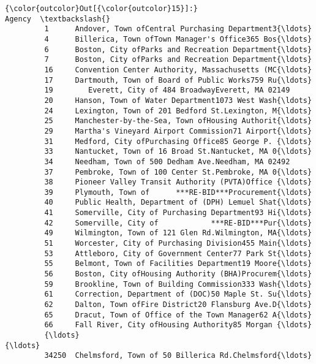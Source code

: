 \documentclass[11pt]{article}
\begin{document}
\begin{Verbatim}[commandchars=\\\{\}]
{\color{outcolor}Out[{\color{outcolor}15}]:}                                                   Agency  \textbackslash{}
         1      Andover, Town ofCentral Purchasing Department3{\ldots}   
         4      Billerica, Town ofTown Manager's Office365 Bos{\ldots}   
         6      Boston, City ofParks and Recreation Department{\ldots}   
         7      Boston, City ofParks and Recreation Department{\ldots}   
         16     Convention Center Authority, Massachusetts (MC{\ldots}   
         17     Dartmouth, Town of Board of Public Works759 Ru{\ldots}   
         19        Everett, City of 484 BroadwayEverett, MA 02149   
         20     Hanson, Town of Water Department1073 West Wash{\ldots}   
         24     Lexington, Town of 201 Bedford St.Lexington, M{\ldots}   
         25     Manchester-by-the-Sea, Town ofHousing Authorit{\ldots}   
         29     Martha's Vineyard Airport Commission71 Airport{\ldots}   
         31     Medford, City ofPurchasing Office85 George P. {\ldots}   
         33     Nantucket, Town of 16 Broad St.Nantucket, MA 0{\ldots}   
         34     Needham, Town of 500 Dedham Ave.Needham, MA 02492   
         37     Pembroke, Town of 100 Center St.Pembroke, MA 0{\ldots}   
         38     Pioneer Valley Transit Authority (PVTA)Office {\ldots}   
         39     Plymouth, Town of      ***RE-BID***Procurement{\ldots}   
         40     Public Health, Department of (DPH) Lemuel Shat{\ldots}   
         41     Somerville, City of Purchasing Department93 Hi{\ldots}   
         42     Somerville, City of            ***RE-BID***Pur{\ldots}   
         49     Wilmington, Town of 121 Glen Rd.Wilmington, MA{\ldots}   
         51     Worcester, City of Purchasing Division455 Main{\ldots}   
         53     Attleboro, City of Government Center77 Park St{\ldots}   
         55     Belmont, Town of Facilities Department19 Moore{\ldots}   
         56     Boston, City ofHousing Authority (BHA)Procurem{\ldots}   
         59     Brookline, Town of Building Commission333 Wash{\ldots}   
         61     Correction, Department of (DOC)50 Maple St. Su{\ldots}   
         62     Dalton, Town ofFire District20 Flansburg Ave.D{\ldots}   
         65     Dracut, Town of Office of the Town Manager62 A{\ldots}   
         66     Fall River, City ofHousing Authority85 Morgan {\ldots}   
         {\ldots}                                                  {\ldots}   
         34250  Chelmsford, Town of 50 Billerica Rd.Chelmsford{\ldots}   

\end{Verbatim}
\end{document}
